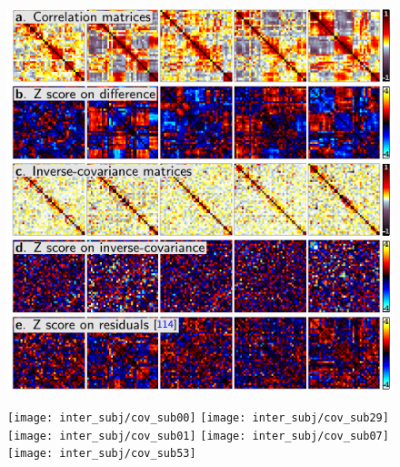 \documentclass[5p]{elsarticle}
\newif\iffinal
\begin{document}
\begin{figure}
\iffinal
    \includegraphics[width=\linewidth]{pg_0005}%
\else
    \begin{preview}
    \hspace*{.5ex}%
    \texttt{[image: inter\_subj/cov\_sub00]}%
    \hspace*{-.2ex}%
    \texttt{[image: inter\_subj/cov\_sub29]}%
    \hspace*{-.2ex}%
    \texttt{[image: inter\_subj/cov\_sub01]}%
    \hspace*{-.2ex}%
    \texttt{[image: inter\_subj/cov\_sub07]}%
    \hspace*{-.2ex}%
    \texttt{[image: inter\_subj/cov\_sub53]}%
    \hspace*{.1ex}%



\end{preview}
\end{figure}
\end{document}
